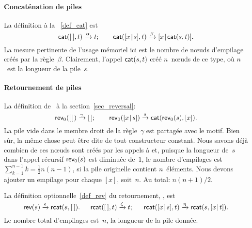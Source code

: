 \paragraph{Concaténation de piles}

La définition à la \fig~\vref{def_cat} est
\begin{equation*}
\textsf{cat}(        [\,],t) \xrightarrow{\smash{\alpha}} t;\qquad
\textsf{cat}([{x}\!\mid\!{s}],t) \xrightarrow{\smash{\beta}}
                                 [{x}\!\mid\!{\textsf{cat}(s,t)}].
\end{equation*}
La mesure pertinente de l'usage mémoriel ici est le nombre de
n{\oe}uds d'empilage créés par la
règle~\(\beta\). Clairement, l'appel \(\textsf{cat}(s,t)\) créé
\(n\)~n{\oe}uds de ce type, où \(n\)~est la longueur de la pile~\(s\).


\paragraph{Retournement de piles}

La définition de~ à la section~\ref{sec_reversal}:
\begin{equation*}
\textsf{rev}_0([\,]) \xrightarrow{\smash{\gamma}} [\,];\qquad
\textsf{rev}_0([{x}\!\mid\!{s}]) \xrightarrow{\smash{\delta}}
                         \textsf{cat}(\textsf{rev}_0(s),[x]).
\end{equation*}
La pile vide dans le membre droit de la règle~\(\gamma\) est partagée
avec le motif. Bien sûr, la même chose peut être dite de tout
constructeur constant. Nous savons déjà combien de ces n{\oe}uds sont
créés par les appels à  et, puisque la longueur de~\(s\)
dans l'appel récursif \(\textsf{rev}_0(s)\) est diminuée de~\(1\), le
nombre d'empilages est \(\sum_{k=1}^{n-1}k = \tfrac{1}{2}n(n-1)\), si
la pile originelle contient \(n\)~éléments. Nous devons ajouter un
empilage pour chaque \([x]\), soit~\(n\). Au total: \(n(n+1)/2\).

La définition optionnelle~\eqref{def_rev} du retournement,
, est
\begin{equation*}
\textsf{rev}(s) \xrightarrow{\smash{\epsilon}} \textsf{rcat}(s,[\,]).\quad\;\;
\textsf{rcat}([\,],t) \xrightarrow{\smash{\zeta}} t;\quad\;\;
\textsf{rcat}([{x}\!\mid\!{s}],t) \xrightarrow{\smash{\eta}} 
                          \textsf{rcat}(s,[{x}\!\mid\!{t}]).
\end{equation*}
Le nombre total d'empilages est~\(n\), la longueur de la pile donnée.

